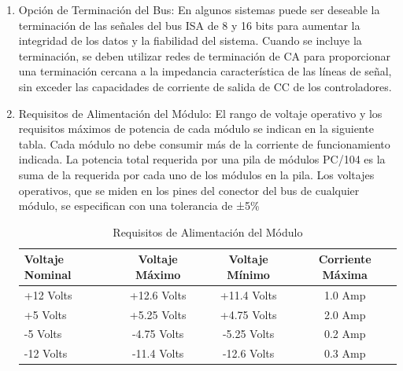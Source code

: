 \documentclass[12pt]{article}
\begin{document}
\begin{enumerate}
		\item Opción de Terminación del Bus: En algunos sistemas puede ser deseable la terminación de las señales del bus ISA de 8 y 16 bits para aumentar la integridad de los datos y la fiabilidad del sistema. Cuando se incluye la terminación, se deben utilizar redes de terminación de CA para proporcionar una terminación cercana a la impedancia característica de las líneas de señal, sin exceder las capacidades de corriente de salida de CC de los controladores.
		
		\item Requisitos de Alimentación del Módulo: El rango de voltaje operativo y los requisitos máximos de potencia de cada módulo se indican en la siguiente tabla. Cada módulo no debe consumir más de la corriente de funcionamiento indicada. La potencia total requerida por una pila de módulos PC/104 es la suma de la requerida por cada uno de los módulos en la pila. Los voltajes operativos, que se miden en los pines del conector del bus de cualquier módulo, se especifican con una tolerancia de ±5\%
		
		\begin{table}[h!]
			\centering
			
			\label{tab:power_requirements}
			\begin{tabular}{|l|c|c|c|}
				\hline
				\textbf{Voltaje Nominal} & \textbf{Voltaje Máximo} & \textbf{Voltaje Mínimo} & \textbf{Corriente Máxima} \\
				\hline
				+12 Volts & +12.6 Volts & +11.4 Volts & 1.0 Amp \\
				\hline
				+5 Volts  & +5.25 Volts & +4.75 Volts & 2.0 Amp \\
				\hline
				-5 Volts  & -4.75 Volts & -5.25 Volts & 0.2 Amp \\
				\hline
				-12 Volts & -11.4 Volts & -12.6 Volts & 0.3 Amp \\
				\hline
			\end{tabular}
			\caption{Requisitos de Alimentación del Módulo}
		\end{table}
	\end{enumerate}
	
\end{document}
